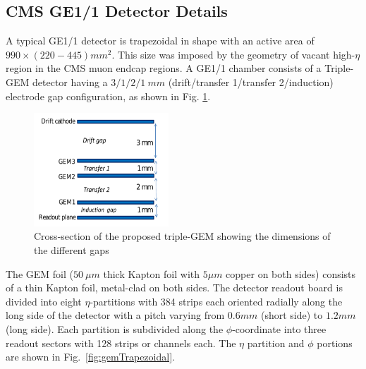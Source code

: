 \subsection{CMS GE1/1 Detector Details} %
\label{sub:GE1/1_detector_details}
A typical GE1/1 detector is trapezoidal in shape with an active area of $990\times (220-445)mm^2$.
This size was imposed by the geometry of vacant high-$\eta$ region in the CMS muon endcap regions.
A GE1/1 chamber consists of a Triple-GEM detector having a $3/1/2/1~mm$ (drift/transfer 1/transfer 2/induction) electrode gap configuration, as shown in Fig. \ref{fig:tripple-gem}.
\begin{figure}[!htbp]
    \begin{center}
        \includegraphics[width=0.45\textwidth]{figures/GEM/tripple-gem.png}
        \caption{Cross-section of the proposed triple-GEM showing the dimensions of the different gaps}
        \label{fig:tripple-gem}
    \end{center}
\end{figure} 
The GEM foil ($50~\mu m$ thick Kapton foil with $5\mu m$ copper on both sides) consists of a thin Kapton foil, metal-clad on both sides.
The detector readout board is divided into eight $\eta$-partitions with 384 strips each oriented radially along the long side of the detector with a pitch varying from $0.6mm$ (short side) to $1.2mm$ (long side).
Each partition is subdivided along the $\phi$-coordinate into three readout sectors with 128 strips or channels each. The $\eta$ partition and $\phi$ portions are shown in Fig.~\ref{fig:gemTrapezoidal}.
